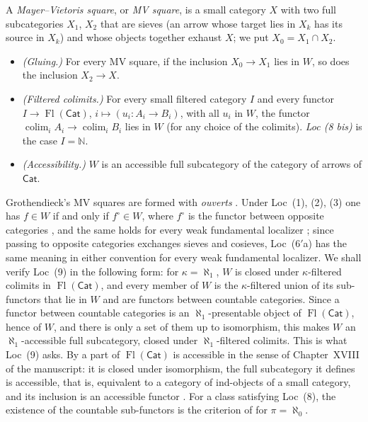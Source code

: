 \documentclass[11pt,a4paper]{article}
\theoremstyle{definition}
\newcommand{\Cat}{\mathsf{Cat}}
\newcommand{\Fl}{\operatorname{Fl}}
\newcommand{\N}{\mathbb{N}}
\newcommand{\colim}{\operatorname*{colim}}
\begin{document}
A \emph{Mayer--Vietoris square}, or \emph{MV square}, is a small category $X$ with two full
subcategories $X_1$, $X_2$ that are sieves (an arrow whose target lies in $X_k$ has its
source in $X_k$) and whose objects together exhaust $X$; we put $X_0=X_1\cap X_2$.
\begin{itemize}[leftmargin=5.8em,labelwidth=5.3em,labelsep=0.5em,align=left]
\item[Loc ($6'$a)] \emph{(Gluing.)} For every MV square, if the inclusion $X_0\to X_1$ lies in
$W$, so does the inclusion $X_2\to X$.
\item[Loc (8)] \emph{(Filtered colimits.)} For every small filtered category $I$ and every
functor $I\to\Fl(\Cat)$, $i\mapsto(u_i\colon A_i\to B_i)$, with all $u_i$ in $W$, the
functor $\colim_i A_i\to\colim_i B_i$ lies in $W$ (for any choice of the colimits). \emph{Loc (8 bis)} is the case
$I=\N$.
\item[Loc (9)] \emph{(Accessibility.)} $W$ is an accessible full subcategory of the category of
arrows of $\Cat$.
\end{itemize}
Grothendieck's MV squares are formed with \emph{ouverts} \cite[XVI, pp.~12--13]{Der}. Under Loc~(1),
(2), (3) one has $f\in W$ if and only if $f^{\circ}\in W$, where $f^{\circ}$ is the functor
between opposite categories \cite[XVI, Rappel~1]{Der}, and the same holds for every weak
fundamental localizer \cite[Prop.~1.1.21]{Mal05}; since passing to opposite categories
exchanges sieves and cosieves, Loc~($6'$a) has the same meaning in either convention for every
weak fundamental localizer. We shall verify Loc~(9) in the following form: for $\kappa=\aleph_1$,
$W$ is closed under $\kappa$-filtered colimits in $\Fl(\Cat)$, and every member of $W$ is the
$\kappa$-filtered union of its sub-functors that lie in $W$ and are functors between
countable categories. Since a functor between countable categories is an $\aleph_1$-presentable
object of $\Fl(\Cat)$, hence of $W$, and there is only a set of them up to isomorphism, this
makes $W$ an $\aleph_1$-accessible full subcategory, closed under $\aleph_1$-filtered colimits.
This is what Loc~(9) asks. By \cite[XVI, 5.2]{Der} a part of $\Fl(\Cat)$ is accessible in the
sense of Chapter~XVIII of the manuscript: it is closed under isomorphism, the full subcategory
it defines is accessible, that is, equivalent to a category of ind-objects of a small category,
and its inclusion is an accessible functor \cite[D\'ef.~4.13.1 and~4.8.7]{DerXVIII}. For a
class satisfying Loc~(8), the existence of the countable sub-functors is the criterion of
\cite[XVI, Cor.~5.3.2]{Der} for $\pi=\aleph_0$.
\end{document}
